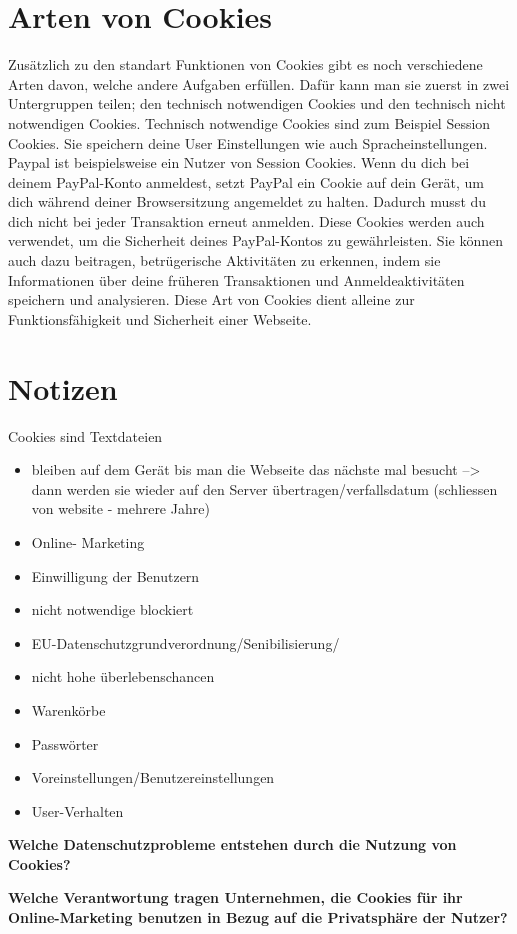 \documentclass{article}
\begin{document}
\section{Arten von Cookies}
Zusätzlich zu den standart Funktionen von Cookies gibt es noch verschiedene Arten davon, welche andere Aufgaben erfüllen. Dafür kann man sie zuerst in zwei Untergruppen teilen; den technisch notwendigen Cookies und den technisch nicht notwendigen Cookies. 
Technisch notwendige Cookies sind zum Beispiel Session Cookies. Sie speichern deine User Einstellungen wie auch Spracheinstellungen. Paypal ist beispielsweise ein Nutzer von Session Cookies. Wenn du dich bei deinem PayPal-Konto anmeldest, setzt PayPal ein Cookie auf dein Gerät, um dich während deiner Browsersitzung angemeldet zu halten. Dadurch musst du dich nicht bei jeder Transaktion erneut anmelden.
Diese Cookies werden auch verwendet, um die Sicherheit deines PayPal-Kontos zu gewährleisten. Sie können auch dazu beitragen, betrügerische Aktivitäten zu erkennen, indem sie Informationen über deine früheren Transaktionen und Anmeldeaktivitäten speichern und analysieren. Diese Art von Cookies dient alleine zur Funktionsfähigkeit und Sicherheit einer Webseite.


\section{Notizen}
Cookies sind Textdateien

    \begin{itemize}
        \renewcommand{\labelitemi}{$\rightarrow$}
\item bleiben auf dem Gerät bis man die Webseite das nächste mal besucht --> dann werden sie wieder auf den Server übertragen/verfallsdatum (schliessen von website - mehrere Jahre)

\item Online- Marketing
\item Einwilligung der Benutzern
\item nicht notwendige blockiert 
\item EU-Datenschutzgrundverordnung/Senibilisierung/
\item nicht hohe überlebenschancen

\item Warenkörbe
\item Passwörter
\item Voreinstellungen/Benutzereinstellungen
\item User-Verhalten

    \end{itemize}

\textbf{Welche Datenschutzprobleme entstehen durch die Nutzung von Cookies?}

\textbf{Welche Verantwortung tragen Unternehmen, die Cookies für ihr Online-Marketing benutzen in Bezug auf die Privatsphäre der Nutzer?}



\printbibliography
 
\end{document}
